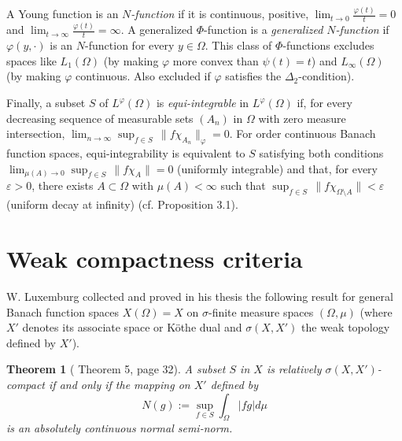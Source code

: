 \documentclass[11pt,a4paper]{amsart}
\newtheorem{teorema}[definicion]{Theorem}
\newcommand{\lphi}{{L^{\varphi}(\Omega)}}
\begin{document}
A Young function is an {\it $N$-function} if it is continuous, positive, $\lim_{t\rightarrow 0}\frac{\varphi(t)}{t}=0$ and $\lim_{t\rightarrow \infty}\frac{\varphi(t)}{t}=\infty$. A generalized $\Phi$-function is a {\it generalized $N$-function} if $\varphi(y,\cdot)$ is an $N$-function for every $y\in\Omega$. This class of $\Phi$-functions excludes spaces like $L_1(\Omega)$ (by making $\varphi$ more convex than $\psi(t)=t$) and $L_\infty(\Omega)$ (by making $\varphi$ continuous. Also excluded if $\varphi$ satisfies the $\Delta_2$-condition).

Finally, a subset $S$ of $\lphi$ is {\it equi-integrable} in $\lphi$ if, for every decreasing sequence of measurable sets $(A_n)$ in $\Omega$ with zero measure intersection, $\lim_{n\rightarrow\infty} \sup_{f\in S} \, \lVert f\chi_{A_n}\rVert_{\varphi}=0$.
For order continuous Banach function spaces, equi-integrability is equivalent to $S$ satisfying both conditions $\lim_{\mu(A)\rightarrow 0} \sup_{f\in S} \, \lVert f\chi_{A}\rVert=0$ (uniformly integrable) and that, for every $\varepsilon>0$, there exists $A\subset\Omega$ with $\mu(A)<\infty$ such that $\sup_{f\in S} \, \lVert f \chi_{\Omega\setminus A}\rVert<\varepsilon$ (uniform decay at infinity) (cf. \cite{PCM2} Proposition 3.1). %


\section{Weak compactness criteria}\label{sec.debilcompacidad}

W. Luxemburg collected and proved in his thesis the following result for general Banach function spaces $X(\Omega)=X$ on $\sigma$-finite measure spaces $(\Omega,\mu)$ (where $X'$ denotes its associate space or K\"othe dual and $\sigma(X,X')$ the weak topology defined by $X'$).

\begin{teorema}[\cite{Luxemburg} Theorem 5, page 32]
A subset $S$ in $X$ is relatively $\sigma(X, X')$-compact if and only if the mapping on $X'$ defined by
$$
N(g):=\sup_{f\in S} \int_{\Omega} \vert fg\vert d\mu
$$
is an absolutely continuous normal semi-norm.
\end{teorema}
\end{document}
